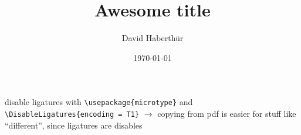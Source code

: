 \documentclass[paper=a4,DIV=calc]{scrartcl}
\title{Awesome title}
\author{David Haberthür}
\date{\today}
\begin{document}
\maketitle

disable ligatures with \verb+\usepackage{microtype}+ and \verb+\DisableLigatures{encoding = T1}+ $\rightarrow$ copying from pdf is easier for stuff like ``different'', since ligatures are disables



\end{document}
